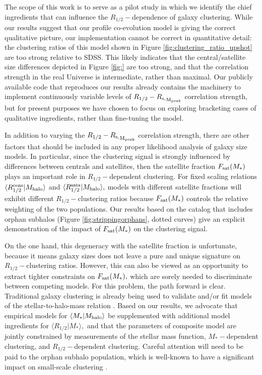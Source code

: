 \documentclass[usenatbib,usegraphicx,letterpaper]{mn2e}
\newcommand{\rhalf}{R_{1/2}}
\newcommand{\mstar}{M_{\ast}}
\newcommand{\mhalo}{M_{\rm halo}}
\newcommand{\rspeak}{{R_{\rm s,}}_{\rm M_{peak}}}
\begin{document}
The scope of this work is to serve as a pilot study in which we identify the chief ingredients that can influence the $\rhalf-$dependence of galaxy clustering. While our results suggest that our profile co-evolution model is giving the correct qualitative picture, our implementation cannot be correct in quantitative detail: the clustering ratios of this model shown in Figure \ref{fig:clustering_ratio_upshot} are too strong relative to SDSS. This likely indicates that the central/satellite size differences depicted in Figure \ref{fig:} are too strong, and that the correlation strength in the real Universe is intermediate, rather than maximal. Our publicly available code that reproduces our results already contains the machinery to implement continuously variable levels of $\rhalf-\rspeak$ correlation strength, but for present purposes we have chosen to focus on exploring bracketing cases of qualitative ingredients, rather than fine-tuning the model. 

In addition to varying the $\rhalf-\rspeak$ correlation strength, there are other factors that should be included in any proper likelihood analysis of galaxy size models. In particular, since the clustering signal is strongly influenced by differences between centrals and satellites, then the satellite fraction $F_{\rm sat}(\mstar)$ plays an important role in $\rhalf-$dependent clustering. For fixed scaling relations $\langle\rhalf^{\rm cens}\vert\mhalo\rangle$ and $\langle\rhalf^{\rm sats}\vert\mhalo\rangle,$ models with different satellite fractions will exhibit different $\rhalf-$clustering ratios because $F_{\rm sat}(\mstar)$ controls the relative weighting of the two populations. Our results based on the catalog that includes orphan subhalos (Figure \ref{fig:strippingorphans}, dotted curves) give an explicit demonstration of the impact of $F_{\rm sat}(\mstar)$ on the clustering signal. 

On the one hand, this degeneracy with the satellite fraction is unfortunate, because it means galaxy sizes does not leave a pure and unique signature on $\rhalf-$clustering ratios. However, this can also be viewed as an opportunity to extract tighter constraints on $F_{\rm sat}(\mstar),$ which are sorely needed to discriminate between competing models. For this problem, the path forward is clear. Traditional galaxy clustering is already being used to validate and/or fit models of the stellar-to-halo-mass relation \citep[e.g.,][]{moster_etal13,behroozi13_smhm,lehmann_etal15}. Based on our results, we advocate that empirical models for $\langle\mstar\vert\mhalo\rangle$ be supplemented with additional model ingredients for $\langle\rhalf\vert\mstar\rangle,$ and that the parameters of composite model are jointly constrained by measurements of the stellar mass function, $\mstar-$dependent clustering, and $\rhalf-$dependent clustering. Careful attention will need to be paid to the orphan subhalo population, which is well-known to have a significant impact on small-scale clustering \citep{guo_white13,campbell_etal17}. 
\end{document}
